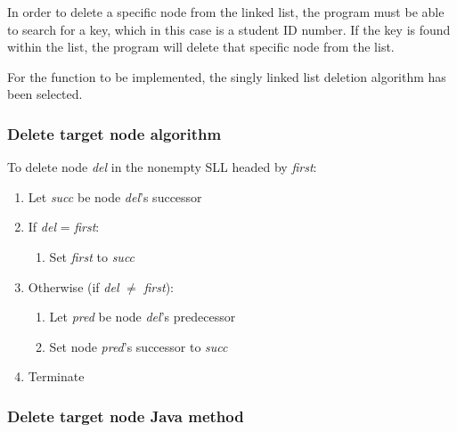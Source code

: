 In order to delete a specific node from the linked list, the program must be able to search for a key, which in this case is a student ID number. If the 
key is found within the list, the program will delete that specific node from the list.

For the function to be implemented, the singly linked list deletion algorithm has been selected.

\subsubsection{Delete target node algorithm}

To delete node \emph{del} in the nonempty SLL headed by \emph{first}:

\begin{enumerate}
\item Let \emph{succ} be node \emph{del}'s successor
\item If \emph{del} = \emph{first}:
	\begin{enumerate}
	\item Set \emph{first} to \emph{succ}
	\end{enumerate}
\item Otherwise (if \emph{del} $\neq$ \emph{first}):
	\begin{enumerate}
	\item Let \emph{pred} be node \emph{del}'s predecessor
	\item Set node \emph{pred}'s successor to \emph{succ}
	\end{enumerate}
\item Terminate
\end{enumerate}

\noindent
\citep[p. 83]{Watt2001}

\subsubsection{Delete target node Java method}

